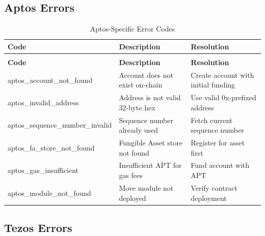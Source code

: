 \subsection{Aptos Errors}

\begin{longtable}{>{\ttfamily\footnotesize}l p{5cm} p{4cm}}
\caption{Aptos-Specific Error Codes} \label{tab:aptos-errors} \\
\toprule
\normalfont\textbf{Code} & \textbf{Description} & \textbf{Resolution} \\
\midrule
\endfirsthead
\multicolumn{3}{c}{\tablename\ \thetable\ -- continued} \\
\toprule
\normalfont\textbf{Code} & \textbf{Description} & \textbf{Resolution} \\
\midrule
\endhead
\midrule
\endfoot
\bottomrule
\endlastfoot
aptos\_account\_not\_found & Account does not exist on-chain & Create account with initial funding \\
aptos\_invalid\_address & Address is not valid 32-byte hex & Use valid 0x-prefixed address \\
aptos\_sequence\_number\_invalid & Sequence number already used & Fetch current sequence number \\
aptos\_fa\_store\_not\_found & Fungible Asset store not found & Register for asset first \\
aptos\_gas\_insufficient & Insufficient APT for gas fees & Fund account with APT \\
aptos\_module\_not\_found & Move module not deployed & Verify contract deployment \\
\end{longtable}

\subsection{Tezos Errors}

